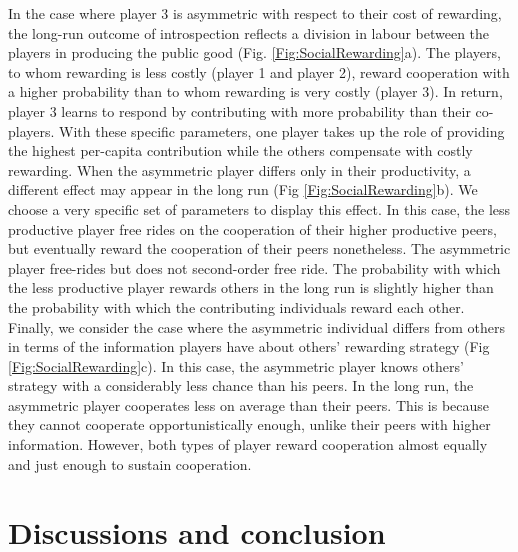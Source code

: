\documentclass[11pt]{article}
\theoremstyle{plainCl1}
\theoremstyle{plainCl2}
\begin{document}
\noindent In the case where player 3 is asymmetric with respect to their cost of rewarding, the long-run outcome of introspection reflects a division in labour between the players in producing the public good (Fig. \ref{Fig:SocialRewarding}a). The players, to whom rewarding is less costly (player 1 and player 2), reward cooperation with a higher probability than to whom rewarding is very costly (player 3). In return, player 3 learns to respond by contributing with more probability than their co-players. With these specific parameters, one player takes up the role of providing the highest per-capita contribution while the others compensate with costly rewarding. When the asymmetric player differs only in their productivity, a different effect may appear in the long run (Fig \ref{Fig:SocialRewarding}b). We choose a very specific set of parameters to display this effect. In this case, the less productive player free rides on the cooperation of their higher productive peers, but eventually reward the cooperation of their peers nonetheless. The asymmetric player free-rides but does not second-order free ride. The probability with which the less productive player rewards others in the long run is slightly higher than the probability with which the contributing individuals reward each other. Finally, we consider the case where the asymmetric individual differs from others in terms of the information players have about others' rewarding strategy (Fig \ref{Fig:SocialRewarding}c). In this case, the asymmetric player knows others' strategy with a considerably less chance than his peers. In the long run, the asymmetric player cooperates less on average than their peers. This is because they cannot cooperate opportunistically enough, unlike their peers with higher information. However, both types of player reward cooperation almost equally and just enough to sustain cooperation. 

\section*{Discussions and conclusion}
\end{document}
